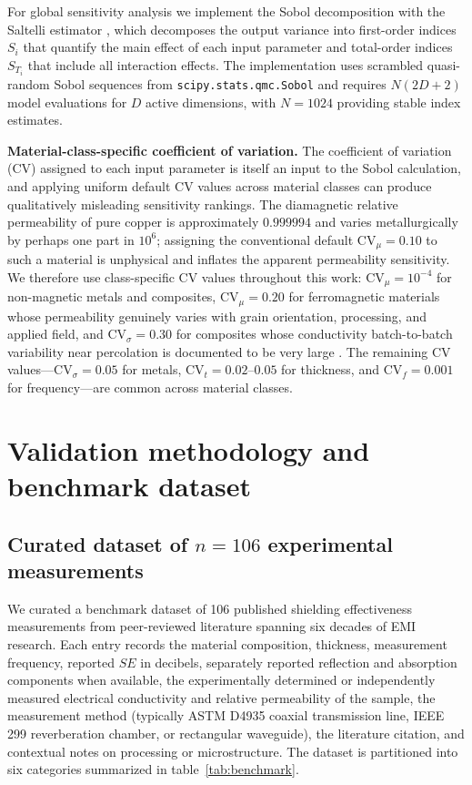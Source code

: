 \documentclass[review,3p,authoryear]{elsarticle}
\begin{document}
For global sensitivity analysis we implement the Sobol decomposition \citep{Sobol2001} with the Saltelli estimator \citep{Saltelli2002}, which decomposes the output variance into first-order indices $S_i$ that quantify the main effect of each input parameter and total-order indices $S_{T_i}$ that include all interaction effects. The implementation uses scrambled quasi-random Sobol sequences from \texttt{scipy.stats.qmc.Sobol} and requires $N(2D + 2)$ model evaluations for $D$ active dimensions, with $N = 1024$ providing stable index estimates.

\textbf{Material-class-specific coefficient of variation.} The coefficient of variation (CV) assigned to each input parameter is itself an input to the Sobol calculation, and applying uniform default CV values across material classes can produce qualitatively misleading sensitivity rankings. The diamagnetic relative permeability of pure copper is approximately $0.999994$ and varies metallurgically by perhaps one part in $10^6$; assigning the conventional default $\mathrm{CV}_\mu = 0.10$ to such a material is unphysical and inflates the apparent permeability sensitivity. We therefore use class-specific CV values throughout this work: $\mathrm{CV}_\mu = 10^{-4}$ for non-magnetic metals and composites, $\mathrm{CV}_\mu = 0.20$ for ferromagnetic materials whose permeability genuinely varies with grain orientation, processing, and applied field, and $\mathrm{CV}_\sigma = 0.30$ for composites whose conductivity batch-to-batch variability near percolation is documented to be very large \citep{Bauhofer2009}. The remaining CV values---$\mathrm{CV}_\sigma = 0.05$ for metals, $\mathrm{CV}_t = 0.02$--$0.05$ for thickness, and $\mathrm{CV}_f = 0.001$ for frequency---are common across material classes.

\section{Validation methodology and benchmark dataset}
\label{sec:validation}

\subsection{Curated dataset of \texorpdfstring{$n = 106$}{n = 106} experimental measurements}

We curated a benchmark dataset of \num{106} published shielding effectiveness measurements from peer-reviewed literature spanning six decades of EMI research. Each entry records the material composition, thickness, measurement frequency, reported $SE$ in decibels, separately reported reflection and absorption components when available, the experimentally determined or independently measured electrical conductivity and relative permeability of the sample, the measurement method (typically ASTM D4935 coaxial transmission line, IEEE 299 reverberation chamber, or rectangular waveguide), the literature citation, and contextual notes on processing or microstructure. The dataset is partitioned into six categories summarized in table~\ref{tab:benchmark}.
\end{document}

